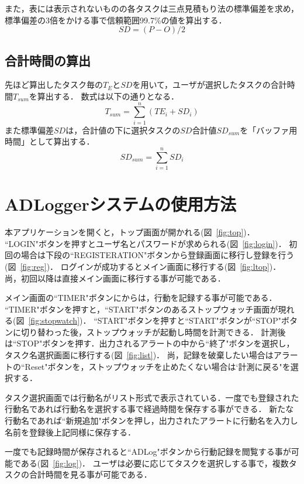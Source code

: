 また，表には表示されないものの各タスクは三点見積もり法の標準偏差を求め，標準偏差の3倍をかける事で信頼範囲99.7\%の値を算出する．
\[ SD = (P - O)/2\]

\subsection{合計時間の算出}

先ほど算出したタスク毎の$T_{E}$と$SD$を用いて，ユーザが選択したタスクの合計時間$T_{sum}$を算出する．
数式は以下の通りとなる．
\[ T_{sum}= \displaystyle\sum_{i=1}^{n} (TE_{i} + SD_{i})\]
また標準偏差$SD$は，合計値の下に選択タスクの$SD$合計値$SD_{sum}$を「バッファ用時間」として算出する．
\[ SD_{sum}= \displaystyle\sum_{i=1}^{n}  SD_{i}\]



\section{ADLoggerシステムの使用方法}
本アプリケーションを開くと，トップ画面が開かれる(図~\ref{fig:top})．
``LOGIN"ボタンを押すとユーザ名とパスワードが求められる(図~\ref{fig:login})．
初回の場合は下段の``REGISTERATION"ボタンから登録画面に移行し登録を行う(図~\ref{fig:reg})．
ログインが成功するとメイン画面に移行する(図~\ref{fig:ltop})．
尚，初回以降は直接メイン画面に移行する事が可能である．

メイン画面の``TIMER"ボタンにからは，行動を記録する事が可能である．
``TIMER"ボタンを押すと，``START"ボタンのあるストップウォッチ画面が現れる(図~\ref{fig:stopwatch})．
``START"ボタンを押すと``START"ボタンが``STOP"ボタンに切り替わった後，ストップウォッチが起動し時間を計測できる．
計測後は``STOP"ボタンを押す．出力されるアラートの中から``終了"ボタンを選択し，タスク名選択画面に移行する(図~\ref{fig:list})．
尚，記録を破棄したい場合はアラートの``Reset"ボタンを，ストップウォッチを止めたくない場合は`計測に戻る"を選択する．

タスク選択画面では行動名がリスト形式で表示されている．一度でも登録された行動名であれば行動名を選択する事で経過時間を保存する事ができる．
新たな行動名であれば``新規追加"ボタンを押し，出力されたアラートに行動名を入力し名前を登録後上記同様に保存する．

一度でも記録時間が保存されると``ADLog"ボタンから行動記録を閲覧する事が可能である(図~\ref{fig:log})．
ユーザは必要に応じてタスクを選択しする事で，複数タスクの合計時間を見る事が可能である．

